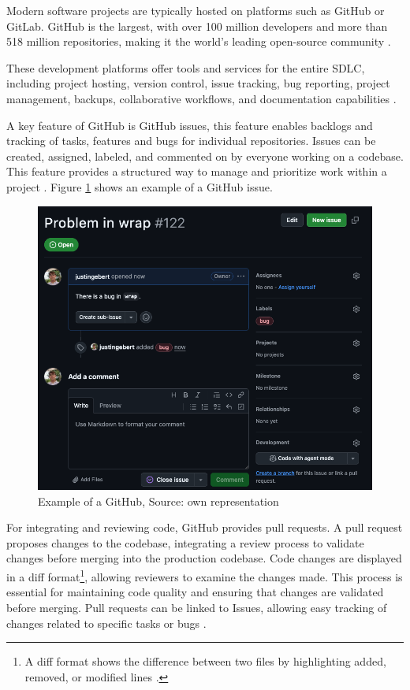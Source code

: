Modern software projects are typically hosted on platforms such as GitHub or GitLab. GitHub is the largest, with over 100 million developers and more than 518 million repositories, making it the world's leading open-source community \cite{staffOctoverseAILeads2024}.

These development platforms offer tools and services for the entire \ac{SDLC}, including project hosting, version control, issue tracking, bug reporting, project management, backups, collaborative workflows, and documentation capabilities \cite{GitHubFeatures2025, abrahamssonAgileSoftwareDevelopment2017}.

A key feature of GitHub is GitHub issues, this feature enables backlogs and tracking of tasks, features and bugs for individual repositories. Issues can be created, assigned, labeled, and commented on by everyone working on a codebase. This feature provides a structured way to manage and prioritize work within a project \cite{Issues}. Figure \ref{fig:gh-issue} shows an example of a GitHub issue.

\begin{figure}[H]
    \centering
    \includegraphics[width=1\textwidth]{images/github/github_issue.png}
    \caption{Example of a GitHub, Source: own representation}
    \label{fig:gh-issue}
\end{figure}

For integrating and reviewing code, GitHub provides pull requests. A pull request proposes changes to the codebase, integrating a review process to validate changes before merging into the production codebase. Code changes are displayed in a diff format\footnote{A diff format shows the difference between two files by highlighting added, removed, or modified lines \cite{WhatDiffUnderstanding}.}, allowing reviewers to examine the changes made. This process is essential for maintaining code quality and ensuring that changes are validated before merging. Pull requests can be linked to Issues, allowing easy tracking of changes related to specific tasks or bugs \cite{PullRequests}.

